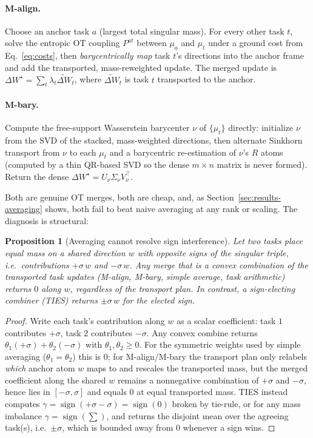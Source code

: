 \documentclass[11pt]{article}
\newtheorem{proposition}{Proposition}
\newcommand{\dW}{\Delta W}
\newcommand{\sign}{\operatorname{sign}}
\begin{document}
\paragraph{M-align.} Choose an anchor task $a$ (largest total singular mass). For every other task $t$,
solve the entropic OT coupling $P^{at}$ between $\mu_a$ and $\mu_t$ under a ground cost from
Eq.~\eqref{eq:costs}, then \emph{barycentrically map} task $t$'s directions into the anchor frame and add
the transported, mass-reweighted update. The merged update is $\dW^\star=\sum_t \lambda_t \widetilde{\dW}_t$,
where $\widetilde{\dW}_t$ is task $t$ transported to the anchor.

\paragraph{M-bary.} Compute the free-support Wasserstein barycenter $\nu$ of $\{\mu_t\}$ directly: initialize
$\nu$ from the SVD of the stacked, mass-weighted directions, then alternate Sinkhorn transport from $\nu$
to each $\mu_t$ and a barycentric re-estimation of $\nu$'s $R$ atoms (computed by a thin QR-based SVD so
the dense $m\times n$ matrix is never formed). Return the dense $\dW^\star=U_\nu\Sigma_\nu V_\nu^\top$.

Both are genuine OT merges, both are cheap, and, as Section~\ref{sec:results-averaging} shows, both
fail to beat naive averaging at any rank or scaling. The diagnosis is structural:

\begin{proposition}[Averaging cannot resolve sign interference]
\label{prop:avg}
Let two tasks place equal mass on a shared direction $w$ with opposite signs of the singular triple,
i.e.\ contributions $+\sigma\,w$ and $-\sigma\,w$. Any merge that is a convex combination of the
transported task updates (M-align, M-bary, simple average, task arithmetic) returns $0$ along $w$,
regardless of the transport plan. In contrast, a sign-electing combiner (TIES) returns
$\pm\sigma\,w$ for the elected sign.
\end{proposition}
\begin{proof}
Write each task's contribution along $w$ as a scalar coefficient: task $1$ contributes $+\sigma$, task
$2$ contributes $-\sigma$. Any convex combine returns $\theta_1(+\sigma)+\theta_2(-\sigma)$ with
$\theta_1,\theta_2\ge 0$. For the symmetric weights used by simple averaging ($\theta_1=\theta_2$) this is
$0$; for M-align/M-bary the transport plan only relabels \emph{which} anchor atom $w$ maps to and rescales
the transported mass, but the merged coefficient along the shared $w$ remains a nonnegative combination of
$+\sigma$ and $-\sigma$, hence lies in $[-\sigma,\sigma]$ and equals $0$ at equal transported mass.
TIES instead computes $\gamma=\sign(+\sigma-\sigma)=\sign(0)$ broken by tie-rule, or for any
mass imbalance $\gamma=\sign(\sum)$, and returns the disjoint mean over the agreeing task(s),
i.e.\ $\pm\sigma$, which is bounded away from $0$ whenever a sign wins.
\end{proof}
\end{document}
